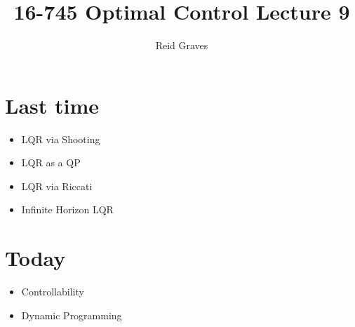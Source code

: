\documentclass[11pt]{article}
\title{16-745 Optimal Control Lecture 9}
\author{Reid Graves}
\begin{document}
\maketitle

\section{Last time}
\begin{itemize}
    \item LQR via Shooting
    \item LQR as a QP
    \item LQR via Riccati
    \item Infinite Horizon LQR
\end{itemize}


\section{Today}
\begin{itemize}
    \item Controllability
    \item Dynamic Programming
\end{itemize}
\end{document}
